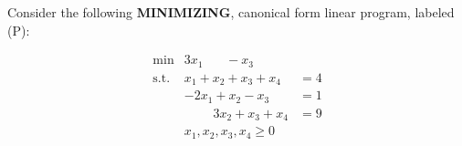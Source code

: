 
Consider the following {\bf MINIMIZING}, canonical form linear program, labeled (P):
\vspace{-2mm}

\begin{equation}
  \label{eq:1}
  \tag{P}
  \begin{array}{lll}
    \min & 3 x_1 \phantom{+  x_2} -  x_3 \phantom{+ 5 x_4} \\
    \mbox{s.t.} & x_1 + x_2 + x_3  + x_4 & = 4 \\[1mm]
    & -2 x_1 + x_2 - x_3  & = 1 \\
    & \phantom{-5 x_1} 3 x_2 + x_3 + x_4 &  = 9 \\
    & x_1, x_2, x_3, x_4 \geq 0 &
  \end{array}
\end{equation}



